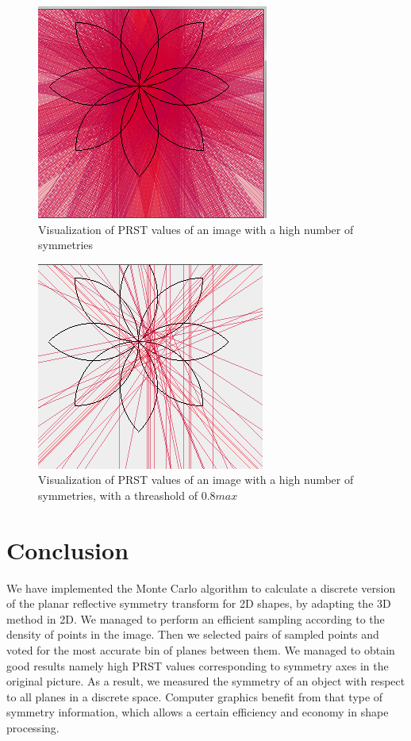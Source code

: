 \documentclass[10pt,a4paper]{article}			%
\begin{document}
\begin{figure}[h]
\centering
 \includegraphics[scale = 0.7]{img/rosace_5000.png}
 \caption{Visualization of PRST values of an image with a high number of symmetries}
 \label{rosace}
\end{figure}


\begin{figure}[h!]
\centering
 \includegraphics[scale = 0.7]{img/rosace_2000_seuil08.png}
 \caption{Visualization of PRST values of an image with a high number of symmetries, with a threashold of $0.8max$}
 \label{rosace 2}
\end{figure}


	\section*{Conclusion}
We have implemented the Monte Carlo algorithm to calculate a discrete version of the planar reflective symmetry transform for 2D shapes, by adapting the 3D method in 2D. We managed to perform an efficient sampling according to the density of points in the image. Then we selected pairs of sampled points and voted for the most accurate bin of planes between them. We managed to obtain good results namely high PRST values corresponding to symmetry axes in the original picture. As a result, we measured the symmetry of an object with respect to all planes in a discrete space. Computer graphics benefit from that type of symmetry information, which allows a certain efficiency and economy in shape processing.

\nocite{*}


		
\end{document}
